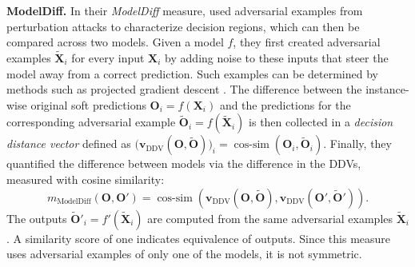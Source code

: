 \documentclass{article}
\newcommand{\citet}{\textcite}
\newcommand{\Out}{\bm{O}}
\newcommand{\Outp}{\bm{O'}}
\newcommand{\subheader}{\textbf}
\begin{document}
\subheader{ModelDiff.}
In their \emph{ModelDiff} measure, \citet{li_modeldiff_2021} used adversarial examples from perturbation attacks to characterize decision regions, which can then be compared across two models.
Given a model $f$, they first created adversarial examples $\widetilde{\bm{X}}_i$ for every input $\bm{X}_i$ by adding noise to these inputs that steer the model away from a correct prediction.
Such examples can be determined by methods such as projected gradient descent \cite{madry_towards_2019}.
The difference between the instance-wise original soft predictions $\Out_i = f(\bm{X}_i)$ and the predictions for the corresponding adversarial example $\widetilde{\Out}_i = f(\widetilde{\bm{X}}_i)$ is then collected in a \emph{decision distance vector} defined as $\big(\bm{v}_{\operatorname{DDV}}(\Out,\widetilde{\Out})\big)_i= \operatorname{cos-sim}(\Out_i, \widetilde{\Out}_i).$
Finally, they quantified the difference between models via the difference in the DDVs, measured with cosine similarity:
\begin{equation}
    m_{\text{ModelDiff}}(\Out, \Outp ) = \operatorname{cos-sim}(\bm{v}_{\operatorname{DDV}}(\Out,\widetilde{\Out}), \bm{v}_{\operatorname{DDV}}(\Outp,\widetilde{\Out}')).
\end{equation}
The outputs $\widetilde{\Out}'_i = f'(\widetilde{\bm{X}}_i)$ are computed from the same adversarial examples $\widetilde{\bm{X}}_i$.
A similarity score of one indicates equivalence of outputs.
Since this measure uses adversarial examples of only one of the models, it is not symmetric.
\end{document}
